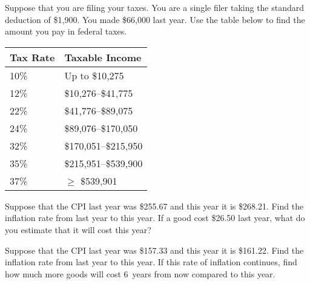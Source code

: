 \documentclass[11pt,letterpaper]{article}
\begin{document}
\problem Suppose that you are filing your taxes. You are a single filer taking the standard deduction of \$1,900. You made \$66,000 last year. Use the table below to find the amount you pay in federal taxes. \par
	\begin{table}[!ht]
	\centering
	\begin{tabular}{|l|l|} \hline
	Tax Rate & Taxable Income \\ \hline \hline
	10\% & Up to \$10,275 \\ \hline
	12\% & \$10,276--\$41,775 \\ \hline
	22\% & \$41,776--\$89,075 \\ \hline
	24\% & \$89,076--\$170,050 \\ \hline
	32\% & \$170,051--\$215,950 \\ \hline
	35\% & \$215,951--\$539,900 \\ \hline
	37\% & $\geq$ \$539,901 \\ \hline
	\end{tabular}
	\end{table}

\problem Suppose that the CPI last year was \$255.67 and this year it is \$268.21. Find the inflation rate from last year to this year. If a good cost \$26.50 last year, what do you estimate that it will cost this year? \pspace



\newpage



\problem Suppose that the CPI last year was \$157.33 and this year it is \$161.22. Find the inflation rate from last year to this year. If this rate of inflation continues, find how much more goods will cost 6~years from now compared to this year. 
\end{document}
